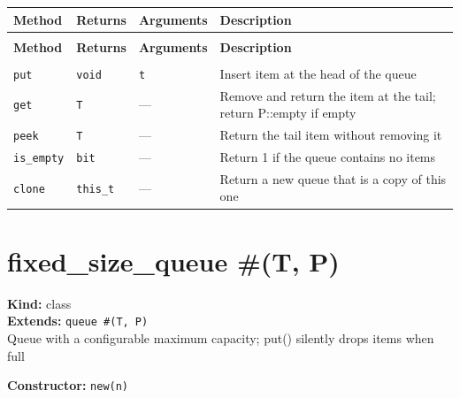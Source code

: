 \documentclass[11pt,letterpaper]{report}
\begin{document}
\begin{xltabular}{\linewidth}{>{\small}p{1.35in} >{\small}p{1.25in} >{\small}p{0.95in} >{\small}X}
\toprule
\textbf{Method} & \textbf{Returns} & \textbf{Arguments} & \textbf{Description} \\
\midrule
\endfirsthead
{} \\
\midrule
\textbf{Method} & \textbf{Returns} & \textbf{Arguments} & \textbf{Description} \\
\midrule
\endhead
\midrule
{} \\
\endfoot
\bottomrule
\endlastfoot
\texttt{put} & \texttt{void} & \texttt{t} & Insert item at the head of the queue \\
\texttt{get} & \texttt{T} & --- & Remove and return the item at the tail; return P::empty if empty \\
\texttt{peek} & \texttt{T} & --- & Return the tail item without removing it \\
\texttt{is\_empty} & \texttt{bit} & --- & Return 1 if the queue contains no items \\
\texttt{clone} & \texttt{this\_t} & --- & Return a new queue that is a copy of this one \\
\end{xltabular}

\section{fixed\_size\_queue \#(T, P)}
\label{cls:fixedsizequeueTP}

\noindent\textbf{Kind:} class\\
\noindent\textbf{Extends:} \texttt{queue \#(T, P)}\\
\noindent Queue with a configurable maximum capacity; put() silently drops items when full

\noindent\textbf{Constructor:} \texttt{new(n)}
\end{document}

